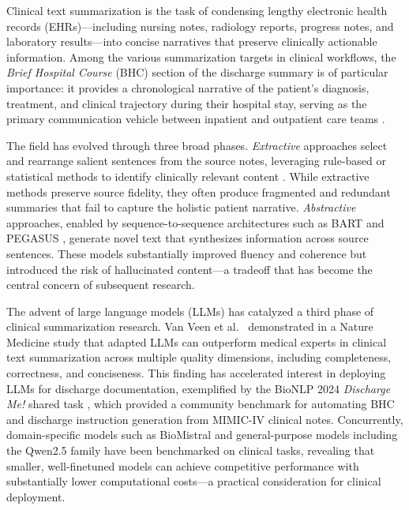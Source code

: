 \documentclass[12pt,a4paper,oneside]{report}
\begin{document}
Clinical text summarization is the task of condensing lengthy electronic health records (EHRs)---including nursing notes, radiology reports, progress notes, and laboratory results---into concise narratives that preserve clinically actionable information. Among the various summarization targets in clinical workflows, the \textit{Brief Hospital Course} (BHC) section of the discharge summary is of particular importance: it provides a chronological narrative of the patient's diagnosis, treatment, and clinical trajectory during their hospital stay, serving as the primary communication vehicle between inpatient and outpatient care teams \cite{adams2022mimicbhc}.

The field has evolved through three broad phases. \textit{Extractive} approaches select and rearrange salient sentences from the source notes, leveraging rule-based or statistical methods to identify clinically relevant content \cite{johnson2016mimiciii}. While extractive methods preserve source fidelity, they often produce fragmented and redundant summaries that fail to capture the holistic patient narrative. \textit{Abstractive} approaches, enabled by sequence-to-sequence architectures such as BART \cite{lewis2020bart} and PEGASUS \cite{zhang2020pegasus}, generate novel text that synthesizes information across source sentences. These models substantially improved fluency and coherence but introduced the risk of hallucinated content---a tradeoff that has become the central concern of subsequent research.

The advent of large language models (LLMs) has catalyzed a third phase of clinical summarization research. Van Veen et al.~\cite{vanveen2024clinical} demonstrated in a Nature Medicine study that adapted LLMs can outperform medical experts in clinical text summarization across multiple quality dimensions, including completeness, correctness, and conciseness. This finding has accelerated interest in deploying LLMs for discharge documentation, exemplified by the BioNLP 2024 \textit{Discharge Me!} shared task \cite{sotudeh2024bionlp}, which provided a community benchmark for automating BHC and discharge instruction generation from MIMIC-IV clinical notes. Concurrently, domain-specific models such as BioMistral \cite{labrak2024biomistral} and general-purpose models including the Qwen2.5 family \cite{yang2024qwen25} have been benchmarked on clinical tasks, revealing that smaller, well-finetuned models can achieve competitive performance with substantially lower computational costs---a practical consideration for clinical deployment.
\end{document}
